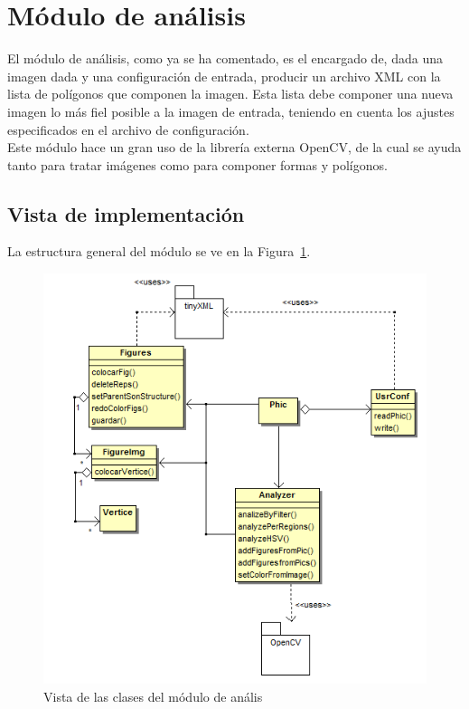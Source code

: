 \section{Módulo de análisis}

El módulo de análisis, como ya se ha comentado, es el encargado de, dada una imagen dada y una configuración de entrada, producir un archivo XML con la lista de polígonos que componen la imagen. Esta lista debe componer una nueva imagen lo más fiel posible a la imagen de entrada, teniendo en cuenta los ajustes especificados en el archivo de configuración.\\

Este módulo hace un gran uso de la librería externa OpenCV, de la cual se ayuda tanto para tratar imágenes como para componer formas y polígonos.

\subsection{Vista de implementación}

La estructura general del módulo se ve en la Figura~\ref{fig:diagramaclasesPHIC}.\\

		\begin{figure}[htbp]
		\centering
		\includegraphics[scale=0.6]{graphics/diagramaclasesPHIC.png}
		\caption{Vista de las clases del módulo de anális}
		\label{fig:diagramaclasesPHIC}
		\end{figure}
		
